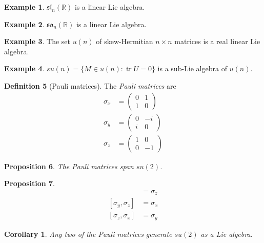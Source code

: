 \documentclass{book}
\newtheorem{prop}{Proposition}[chapter]
\newtheorem{cor}{Corollary}[prop]
\theoremstyle{definition}
\newtheorem{df}[prop]{Definition}
\newtheorem{ex}[prop]{Example}
\renewcommand{\sl}[2]{\ensuremath{\mathfrak{sl}_{#1} \left( {#2} \right)}}
\newcommand{\so}[2]{\ensuremath{\mathfrak{so}_{#1} \left( {#2} \right)}}
\newcommand{\tr}{\ensuremath{\operatorname{tr}}}
\begin{document}
\begin{ex}
$\sl{n}{\mathbb{R}}$ is a linear Lie algebra.
\end{ex}

\begin{ex}
$\so{n}{\mathbb{R}}$ is a linear Lie algebra.
\end{ex}

\begin{ex}
The set $u(n)$ of skew-Hermitian $n \times n$ matrices is a real linear Lie algebra.
\end{ex}

\begin{ex}
$su(n) = \{ M \in u(n) : \tr U = 0 \}$ is a sub-Lie algebra of $u(n)$.
\end{ex}

\begin{df}[Pauli matrices]
The \emph{Pauli matrices} are
\begin{align*}
\sigma_x & = \left( \begin{array}{cc}
0 & 1 \\ 1 & 0
\end{array} \right) \\
\sigma_y & = \left( \begin{array}{cc}
0 & -i \\ i & 0
\end{array} \right) \\
\sigma_z & = \left( \begin{array}{cc}
1 & 0 \\ 0 & -1
\end{array} \right)
\end{align*}
\end{df}

\begin{prop}
The Pauli matrices span $su(2)$.
\end{prop}

\begin{prop}
\begin{align*}
[\sigma_x, \sigma_y] & = \sigma_z \\
[\sigma_y, \sigma_z] & = \sigma_x \\
[\sigma_z, \sigma_x] & = \sigma_y
\end{align*}
\end{prop}

\begin{cor}
Any two of the Pauli matrices generate $su(2)$ as a Lie algebra.
\end{cor}
\end{document}
